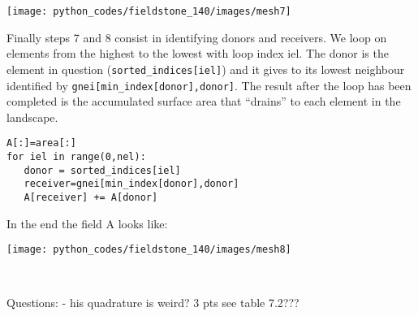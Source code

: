 \begin{center}
\texttt{[image: python\_codes/fieldstone\_140/images/mesh7]}
\end{center}

Finally steps 7 and 8 consist in identifying donors and receivers. 
We loop on elements from the highest to the lowest with loop index iel.
The donor is the element in question ({\tt sorted\_indices[iel]}) and 
it gives to its lowest neighbour identified by {\tt gnei[min\_index[donor],donor]}.
The result after the loop has been
completed is the accumulated surface area that ``drains'' to each element in the landscape.

\begin{lstlisting}
A[:]=area[:]
for iel in range(0,nel):
   donor = sorted_indices[iel] 
   receiver=gnei[min_index[donor],donor]
   A[receiver] += A[donor] 
\end{lstlisting}

In the end the field A looks like:
\begin{center}
\texttt{[image: python\_codes/fieldstone\_140/images/mesh8]}
\end{center}















\newpage
\begin{center}
\\
\end{center}

Questions:
- his quadrature is weird?  3 pts see table 7.2???
